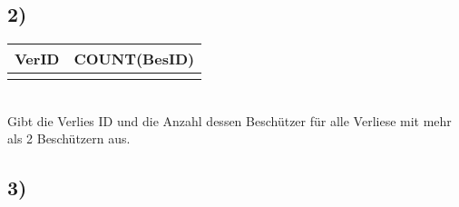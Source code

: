 \documentclass[a4paper,12pt]{article}
\begin{document}
\subsection*{2)}
\begin{tabular}{|c|c|}
\hline
VerID & COUNT(BesID) \\
\hline
 &\\
\hline
\end{tabular}\\
Gibt die Verlies ID und die Anzahl dessen Beschützer für alle Verliese mit mehr als 2 Beschützern aus.
\subsection*{3)}
\end{document}
